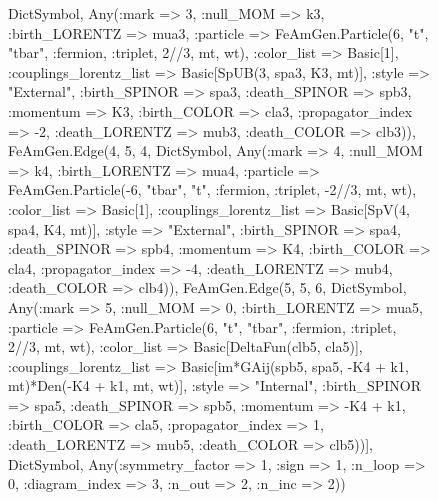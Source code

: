 \documentclass{revtex4}
\begin{document}
\begin{figure}[!htb]
\begin{center}
{Dict{Symbol, Any}(:mark => 3, :null_MOM => k3, :birth_LORENTZ => mua3, :particle => FeAmGen.Particle(6, "t", "tbar", :fermion, :triplet, 2//3, mt, wt), :color_list => Basic[1], :couplings_lorentz_list => Basic[SpUB(3, spa3, K3, mt)], :style => "External", :birth_SPINOR => spa3, :death_SPINOR => spb3, :momentum => K3, :birth_COLOR => cla3, :propagator_index => -2, :death_LORENTZ => mub3, :death_COLOR => clb3)), FeAmGen.Edge(4, 5, 4, Dict{Symbol, Any}(:mark => 4, :null_MOM => k4, :birth_LORENTZ => mua4, :particle => FeAmGen.Particle(-6, "tbar", "t", :fermion, :triplet, -2//3, mt, wt), :color_list => Basic[1], :couplings_lorentz_list => Basic[SpV(4, spa4, K4, mt)], :style => "External", :birth_SPINOR => spa4, :death_SPINOR => spb4, :momentum => K4, :birth_COLOR => cla4, :propagator_index => -4, :death_LORENTZ => mub4, :death_COLOR => clb4)), FeAmGen.Edge(5, 5, 6, Dict{Symbol, Any}(:mark => 5, :null_MOM => 0, :birth_LORENTZ => mua5, :particle => FeAmGen.Particle(6, "t", "tbar", :fermion, :triplet, 2//3, mt, wt), :color_list => Basic[DeltaFun(clb5, cla5)], :couplings_lorentz_list => Basic[im*GAij(spb5, spa5, -K4 + k1, mt)*Den(-K4 + k1, mt, wt)], :style => "Internal", :birth_SPINOR => spa5, :death_SPINOR => spb5, :momentum => -K4 + k1, :birth_COLOR => cla5, :propagator_index => 1, :death_LORENTZ => mub5, :death_COLOR => clb5))], Dict{Symbol, Any}(:symmetry_factor => 1, :sign => 1, :n_loop => 0, :diagram_index => 3, :n_out => 2, :n_inc => 2)) 
}
\end{center}
\end{figure}
\end{document}
